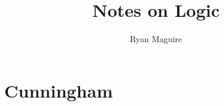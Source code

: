 \documentclass{book}                                                           %
\begin{document}
    \title{Notes on Logic}
    \author{Ryan Maguire}
    \date{\vspace{-5ex}}
    \maketitle
    \tableofcontents
    \listoffigures
    \chapter{Cunningham}
\end{document}
